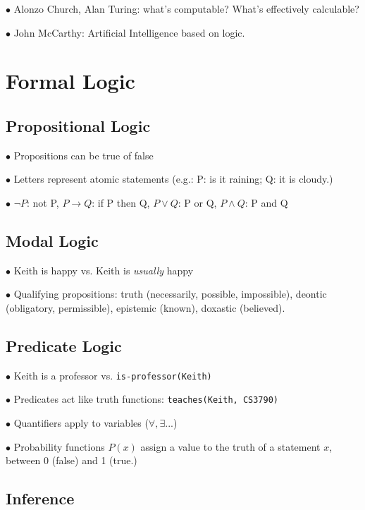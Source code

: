 \documentclass[english,openany]{book}
\begin{document}
$\bullet$ Alonzo Church, Alan Turing: what's computable? What's effectively calculable?

$\bullet$ John McCarthy: Artificial Intelligence based on logic.

\section{Formal Logic}

\subsection{Propositional Logic}

$\bullet$ Propositions can be true of false

$\bullet$ Letters represent atomic statements (e.g.: P: is it raining; Q: it is cloudy.)

$\bullet$ $\neg P$: not P, $P \rightarrow Q$: if P then Q, $P \lor Q$: P or Q, $P \wedge Q$: P and Q

\subsection{Modal Logic}

$\bullet$ Keith is happy vs. Keith is \textit{usually} happy

$\bullet$ Qualifying propositions: truth (necessarily, possible, impossible), deontic (obligatory, permissible), epistemic (known), doxastic (believed).

\subsection{Predicate Logic}

$\bullet$ Keith is a professor vs. \texttt{is-professor(Keith)}

$\bullet$ Predicates act like truth functions: \texttt{teaches(Keith, CS3790)}

$\bullet$ Quantifiers apply to variables ($\forall, \exists...$)

$\bullet$ Probability functions $P(x)$ assign a value to the truth of a statement $x$, between 0 (false) and 1 (true.)

\subsection{Inference}

\end{document}
